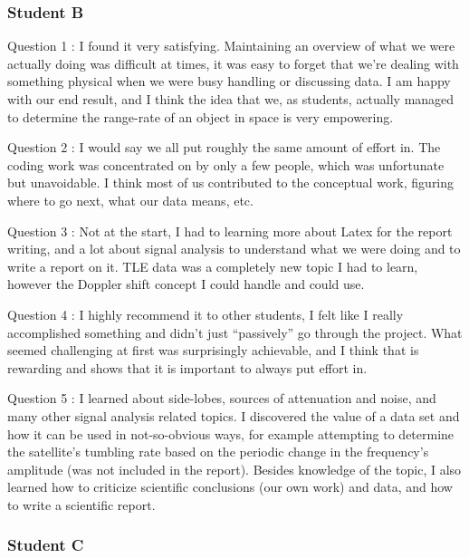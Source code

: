 \documentclass[11pt,a4paper,oneside]{article}
\newcommand{\listskip}{0pt}
\newenvironment{description*}
{\begin{description}
  \setlength{\itemsep}{\listskip}
  \setlength{\parskip}{\listskip}
  \setlength{\parsep}{\listskip}}
{\end{description}}
\newcommand{\quotes}[1]{``#1''}
\begin{document}
\subsubsection{Student B}

\begin{description*}
\item[Question 1]: I found it very satisfying. Maintaining an overview of what we were actually doing was difficult at times, it was easy to forget that we're dealing with something physical when we were busy handling or discussing data. I am happy with our end result, and I think the idea that we, as students, actually managed to determine the range-rate of an object in space is very empowering.
\item[Question 2]: I would say we all put roughly the same amount of effort in. The coding work was concentrated on by only a few people, which was unfortunate but unavoidable. I think most of us contributed to the conceptual work, figuring where to go next, what our data means, etc.
\item[Question 3]: Not at the start, I had to learning more about Latex for the report writing, and a lot about signal analysis to understand what we were doing and to write a report on it. TLE data was a completely new topic I had to learn, however the Doppler shift concept I could handle and could use.
\item[Question 4]: I highly recommend it to other students, I felt like I really accomplished something and didn't just \quotes{passively} go through the project. What seemed challenging at first was surprisingly achievable, and I think that is rewarding and shows that it is important to always put effort in.
\item[Question 5]: I learned about side-lobes, sources of attenuation and noise, and many other signal analysis related topics. I discovered the value of a data set and how it can be used in not-so-obvious ways, for example attempting to determine the satellite's tumbling rate based on the periodic change in the frequency's amplitude (was not included in the report). Besides knowledge of the topic, I also learned how to criticize scientific conclusions (our own work) and data, and how to write a scientific report.
\end{description*}


\subsubsection{Student C}
\end{document}
